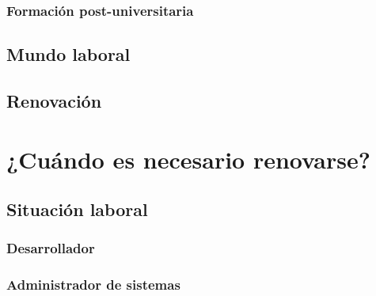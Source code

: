 \documentclass[11pt, a4paper]{report}
\begin{document}
            \subsubsection{Formación post-universitaria}
        		\paragraph{}

        \subsection{Mundo laboral}
        	\paragraph{}
            
        \subsection{Renovación}
        	\paragraph{}
            
            
    \section{¿Cuándo es necesario renovarse?}
    
    	\subsection{Situación laboral}
        	\paragraph{}
            
             \subsubsection{Desarrollador}
        		\paragraph{}
        	
    		\subsubsection{Administrador de sistemas}
\end{document}
